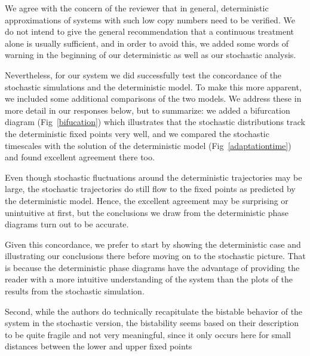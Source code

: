 \documentclass[11pt,letterpaper]{article}
\begin{document}
\begin{response}
We agree with the concern of the reviewer that in general, deterministic
approximations of systems with such low copy numbers need to be verified. We do not intend to give the general recommendation that a
continuous treatment alone is usually sufficient, and in order to avoid
this, we added some words of warning in the beginning of our
deterministic as well as our stochastic analysis.

Nevertheless, for our system we did successfully test the concordance of the stochastic simulations and the deterministic model. To make this more apparent, we included some additional comparisons of the two
models. We address these in more detail in our responses below,
but to summarize: we added a bifurcation diagram
(Fig~\ref{bifucation}) which illustrates that the stochastic
distributions track the deterministic fixed points very well,
and we compared the stochastic timescales with the solution of the
deterministic model (Fig~\ref{adaptationtime}) and found excellent
agreement there too. 

Even though stochastic fluctuations around the deterministic
trajectories may be large, the stochastic trajectories do still flow to
the fixed points as predicted by the deterministic model.
Hence, the excellent agreement may be surprising or unintuitive at first, but the conclusions we draw from the deterministic phase diagrams turn out to be accurate.


Given this concordance, we prefer to start by showing the deterministic case and illustrating our conclusions there before moving on to the stochastic picture. That is because the deterministic phase diagrams have the advantage of providing the reader with a more intuitive understanding of the system than the plots of the results from the stochastic simulation.
\end{response}

\begin{review}
Second, while the authors do technically recapitulate the bistable
behavior of the system in the stochastic version, the bistability seems
based on their description to be quite fragile and not very meaningful,
since it only occurs here for small distances between the lower and
upper fixed points
\end{review}
\end{document}
